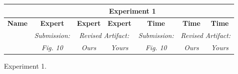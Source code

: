 \begin{figure}

\experimentTableSize

\begin{tabular}{l|cccccc}
& \multicolumn{6}{c}{\textbf{Experiment 1}} \\\hline
\textbf{Name} &
\textbf{Expert} & \textbf{Expert} & \textbf{Expert} &
\textbf{Time} & \textbf{Time} & \textbf{Time} \\
&
\textit{Submission:} & \multicolumn{2}{c}{\textit{Revised Artifact:}} &
\textit{Submission:} & \multicolumn{2}{c}{\textit{Revised Artifact:}} \\
&
\textit{Fig. 10} & \textit{Ours} & \textit{Yours} &
\textit{Fig. 10} & \textit{Ours} & \textit{Yours} \\

\end{tabular}

\caption{Experiment 1.}

\end{figure}
